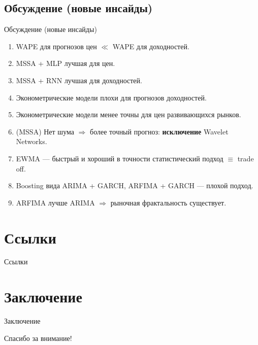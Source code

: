 \documentclass[11pt, aspectratio= 169]{beamer}
\begin{document}
	\subsection{Обсуждение (новые инсайды)}
	\begin{frame}{Обсуждение (новые инсайды)}
		\begin{enumerate}
			\item WAPE  для прогнозов цен $\ll$ WAPE для доходностей.
			\item MSSA + MLP лучшая для цен.
			\item MSSA + RNN лучшая для доходностей.
			\item Эконометрические модели плохи для прогнозов доходностей.
			\item Эконометрические модели менее точны для цен развивающихся рынков.
			\item (MSSA) Нет шума $\Rightarrow$ более точный прогноз: \textbf{исключение} Wavelet Networks.
			\item EWMA --- быстрый и хороший в точности статистический подход $\equiv$ trade off.
			\item Boosting вида ARIMA + GARCH, ARFIMA + GARCH --- плохой подход.
			\item ARFIMA лучше ARIMA $\Rightarrow$ рыночная фрактальность существует.
		\end{enumerate}
	\end{frame}
	
	\section{Ссылки}
	\begin{frame}[allowframebreaks]{Ссылки}
		
		
	\end{frame}
	
	\section{Заключение}
	\begin{frame}{Заключение}
		\begin{center}
			\LARGE
			Спасибо за внимание!
		\end{center}
	\end{frame}
\end{document}

